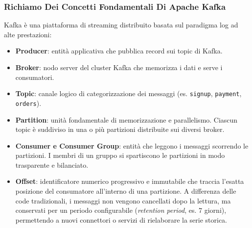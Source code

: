 \documentclass[11pt, a4paper]{article}
\begin{document}
\subsubsection{Richiamo Dei Concetti Fondamentali Di Apache Kafka}
Kafka è una piattaforma di streaming distribuito basata sul paradigma log ad alte prestazioni:
\begin{itemize}[noitemsep]
    \item \textbf{Producer}: entità applicativa che pubblica record sui topic di Kafka.
    \item \textbf{Broker}: nodo server del cluster Kafka che memorizza i dati e serve i consumatori.
    \item \textbf{Topic}: canale logico di categorizzazione dei messaggi (es. \texttt{signup}, \texttt{payment}, \texttt{orders}).
    \item \textbf{Partition}: unità fondamentale di memorizzazione e parallelismo. Ciascun topic è suddiviso in una o più partizioni distribuite sui diversi broker.
    \item \textbf{Consumer e Consumer Group}: entità che leggono i messaggi scorrendo le partizioni. I membri di un gruppo si spartiscono le partizioni in modo trasparente e bilanciato.
    \item \textbf{Offset}: identificatore numerico progressivo e immutabile che traccia l'esatta posizione del consumatore all'interno di una partizione. A differenza delle code tradizionali, i messaggi non vengono cancellati dopo la lettura, ma conservati per un periodo configurabile (\emph{retention period}, es. 7 giorni), permettendo a nuovi connettori o servizi di rielaborare la serie storica.
\end{itemize}

\end{document}
